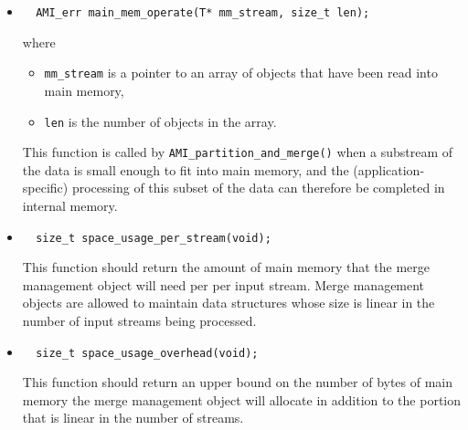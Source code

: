 \begin{itemize}
    \item {}
\begin{lstlisting}
  AMI_err main_mem_operate(T* mm_stream, size_t len);
\end{lstlisting}
\noindent
where
    \begin{itemize}
    \item \lstinline|mm_stream| is a pointer to an array of objects
      that have been read into main memory,
    \item \lstinline|len| is the number of objects in the array.
    \end{itemize}
    
    This function is called by \lstinline|AMI_partition_and_merge()|
    when a substream of the data is small enough to fit into main
    memory, and the (application-specific) processing of this subset
    of the data can therefore be completed in internal memory.

    
  \item {}
\begin{lstlisting}
  size_t space_usage_per_stream(void);
\end{lstlisting}
This function should return the amount of main memory that the merge
management object will need per per input stream. Merge management
objects are allowed to maintain data structures whose size is linear
in the number of input streams being processed.

\item {}
\begin{lstlisting}
  size_t space_usage_overhead(void);
\end{lstlisting}
This function should return an upper bound on the number of bytes of
main memory the merge management object will allocate in addition to
the portion that is linear in the number of streams.
    
\end{itemize}



 
 

